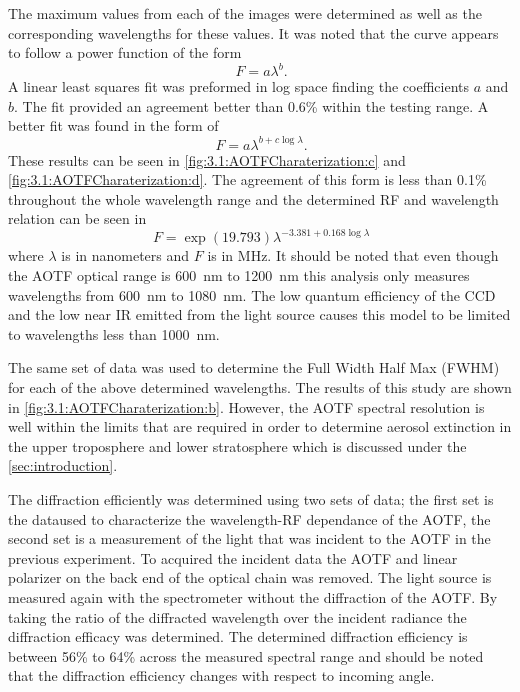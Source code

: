 \documentclass[12pt]{article}
\begin{document}
The maximum values from each of the images were determined as well as the corresponding wavelengths for these values. It was noted that the curve appears to follow a power function of the form
\begin{equation}
    \ F = a\lambda^{b}.
    \label{eqn:3.1:powerFunction}
\end{equation}
A linear least squares fit was preformed in log space finding the coefficients $a$ and $b$. The fit provided an agreement better than 0.6\% within the testing range. A better fit was found in the form of
 \begin{equation}
    \ F = a\lambda^{b+c\log\lambda}.
    \label{eqn:3.1:modifiedPowerFunction}
\end{equation}
These results can be seen in \autoref{fig:3.1:AOTFCharaterization:c} and \autoref{fig:3.1:AOTFCharaterization:d}. The agreement of this form is less than 0.1\% throughout the whole wavelength range and the determined RF and wavelength relation can be seen in
\begin{equation}
    \ F = \exp{(19.793)}\lambda^{-3.381+0.168\log\lambda}
    \label{eqn:3.1:modifiedPowerFunctionCoeffiecicents}
\end{equation}
where $\lambda$ is in nanometers and $F$ is in MHz. It should be noted that even though the AOTF optical range is 600~nm to 1200~nm this analysis only measures wavelengths from 600~nm to 1080~nm. The low quantum efficiency of the CCD and the low near IR emitted from the light source causes this model to be limited to wavelengths less than 1000~nm.

The same set of data was used to determine the Full Width Half Max (FWHM) for each of the above determined wavelengths. The results of this study are shown in \autoref{fig:3.1:AOTFCharaterization:b}. However, the AOTF spectral resolution is well within the limits that are required in order to determine aerosol extinction in the upper troposphere and lower stratosphere which is discussed under the \autoref{sec:introduction}.

The diffraction efficiently was determined using two sets of data; the first set is the dataused to  characterize the wavelength-RF dependance of the AOTF, the second set is a measurement of the light that was incident to the AOTF in the previous experiment. To acquired the incident data the AOTF and linear polarizer on the back end of the optical chain was removed. The light source is measured again with the spectrometer without the diffraction of the AOTF. By taking the ratio of the diffracted wavelength over the incident radiance the diffraction efficacy was determined. The determined diffraction efficiency is between 56\% to 64\% across the measured spectral range and should be noted that the diffraction efficiency changes with respect to incoming angle.
\end{document}
